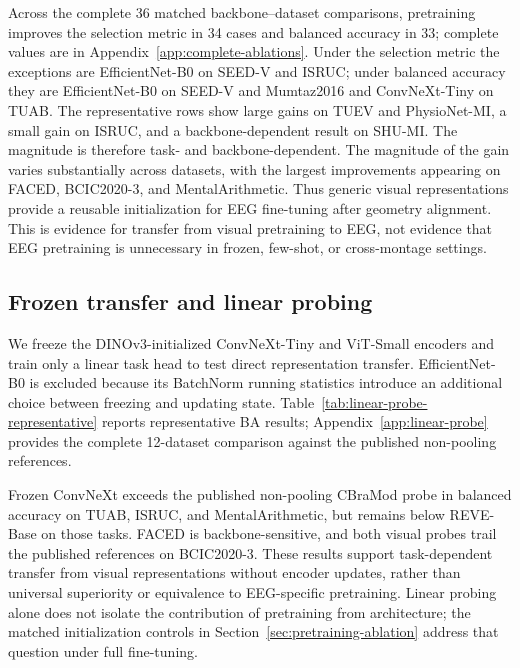Across the complete 36 matched backbone--dataset comparisons, pretraining
improves the selection metric in 34 cases and balanced accuracy in 33;
complete values are in
Appendix~\ref{app:complete-ablations}. Under the selection metric the
exceptions are EfficientNet-B0 on SEED-V and ISRUC; under balanced accuracy
they are EfficientNet-B0 on SEED-V and Mumtaz2016 and ConvNeXt-Tiny on TUAB. The
representative rows show large gains on TUEV and PhysioNet-MI, a small gain on
ISRUC, and a
backbone-dependent result on SHU-MI. The magnitude is therefore task- and
backbone-dependent. The magnitude of the gain varies substantially across datasets, with the
largest improvements appearing on FACED, BCIC2020-3, and MentalArithmetic. Thus generic visual
representations provide a reusable initialization for EEG fine-tuning after
geometry alignment. This is evidence for transfer from visual pretraining to
EEG, not evidence that EEG pretraining is unnecessary in frozen, few-shot, or
cross-montage settings.

\subsection{Frozen transfer and linear probing}
\label{sec:linear-probe}

We freeze the DINOv3-initialized ConvNeXt-Tiny and ViT-Small encoders and
train only a linear task head to test direct representation transfer.
EfficientNet-B0 is excluded because its BatchNorm running statistics introduce
an additional choice between freezing and updating state.
Table~\ref{tab:linear-probe-representative} reports representative BA results;
Appendix~\ref{app:linear-probe} provides the complete 12-dataset comparison
against the published non-pooling references.

Frozen ConvNeXt exceeds the published non-pooling CBraMod probe in balanced
accuracy on TUAB,
ISRUC, and MentalArithmetic, but remains below REVE-Base on those tasks.
FACED is backbone-sensitive, and both visual probes trail the published
references on BCIC2020-3. These results support task-dependent transfer from
visual representations without encoder updates, rather than universal
superiority or equivalence to EEG-specific pretraining. Linear probing alone
does not isolate the contribution of pretraining from architecture; the
matched initialization controls in Section~\ref{sec:pretraining-ablation}
address that question under full fine-tuning.

